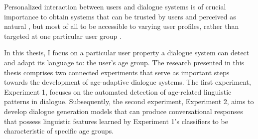 Personalized interaction between users and dialogue systems is of crucial importance to obtain systems that can be trusted by users and perceived as natural \citep{van2019exploring}, but most of all to be accessible to varying user profiles, rather than targeted at one particular user group \citep{zheng2019personalized, zeng-etal-2020-meddialog}.

In this thesis, I focus on a particular user property a dialogue system can detect and adapt its language to: the user's age group. 
The research presented in this thesis comprises two connected experiments that serve as important steps towards the development of age-adaptive dialogue systems.
The first experiment, Experiment 1, focuses on the automated detection of age-related linguistic patterns in dialogue. 
Subsequently, the second experiment, Experiment 2, aims to develop dialogue generation models that can produce conversational responses that possess linguistic features learned by Experiment 1's classifiers to be characteristic of specific age groups.

